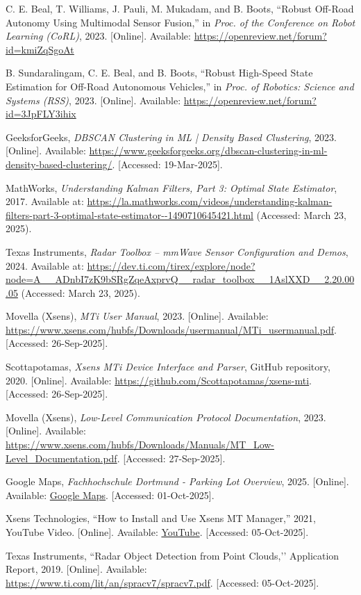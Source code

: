 \begin{thebibliography}{00}
C. E. Beal, T. Williams, J. Pauli, M. Mukadam, and B. Boots, 
``Robust Off-Road Autonomy Using Multimodal Sensor Fusion,'' 
in \textit{Proc. of the Conference on Robot Learning (CoRL)}, 2023. [Online]. Available: \url{https://openreview.net/forum?id=kmiZqSgoAt}

B. Sundaralingam, C. E. Beal, and B. Boots, 
``Robust High-Speed State Estimation for Off-Road Autonomous Vehicles,'' 
in \textit{Proc. of Robotics: Science and Systems (RSS)}, 2023. [Online]. Available: \url{https://openreview.net/forum?id=3JpFLY3ihix}

GeeksforGeeks, 
\emph{DBSCAN Clustering in ML | Density Based Clustering}, 
2023. [Online]. Available: \url{https://www.geeksforgeeks.org/dbscan-clustering-in-ml-density-based-clustering/}. [Accessed: 19-Mar-2025].

MathWorks,
\textit{Understanding Kalman Filters, Part 3: Optimal State Estimator},
2017. Available at: \url{https://la.mathworks.com/videos/understanding-kalman-filters-part-3-optimal-state-estimator--1490710645421.html} (Accessed: March 23, 2025).

Texas Instruments, 
\textit{Radar Toolbox – mmWave Sensor Configuration and Demos}, 
2024. Available at: \url{https://dev.ti.com/tirex/explore/node?node=A__ADnbI7zK9bSRgZqeAxprvQ__radar_toolbox__1AslXXD__2.20.00.05} (Accessed: March 23, 2025).

Movella (Xsens),  
\textit{MTi User Manual},  
2023. [Online]. Available: \url{https://www.xsens.com/hubfs/Downloads/usermanual/MTi_usermanual.pdf}. [Accessed: 26-Sep-2025].  

Scottapotamas,  
\textit{Xsens MTi Device Interface and Parser},  
GitHub repository, 2020. [Online]. Available: \url{https://github.com/Scottapotamas/xsens-mti}. [Accessed: 26-Sep-2025].  

Movella (Xsens),  
\textit{Low-Level Communication Protocol Documentation},  
2023. [Online]. Available: \url{https://www.xsens.com/hubfs/Downloads/Manuals/MT_Low-Level_Documentation.pdf}. [Accessed: 27-Sep-2025].  

Google Maps, 
\emph{Fachhochschule Dortmund - Parking Lot Overview}, 
2025. [Online]. Available: \href{https://www.google.com/maps/search/fh+dortmund/@51.5061964,7.4567,105m/data=!3m1!1e3?entry=ttu&g_ep=EgoyMDI1MDkyOC4wIKXMDSoASAFQAw%3D%3D}{Google Maps}. 
[Accessed: 01-Oct-2025].

Xsens Technologies, ``How to Install and Use Xsens MT Manager,'' 2021, YouTube Video. [Online]. Available: \href{https://www.youtube.com/watch?v=eg5tF_EgDeU}{YouTube}. [Accessed: 05-Oct-2025].

Texas Instruments, 
``Radar Object Detection from Point Clouds,’’ 
Application Report, 2019. 
[Online]. Available: \url{https://www.ti.com/lit/an/spracv7/spracv7.pdf}. 
[Accessed: 05-Oct-2025].


\end{thebibliography}